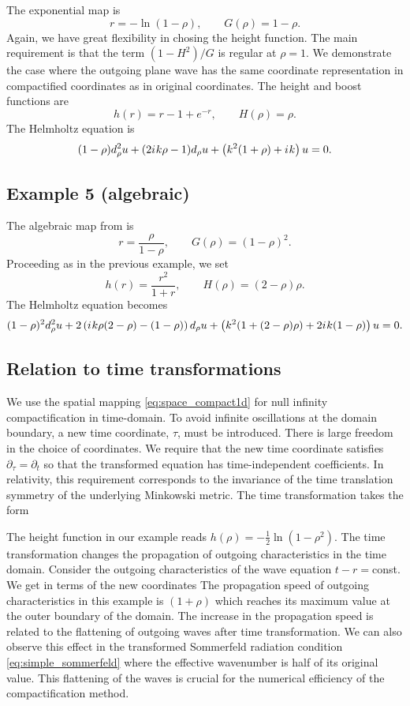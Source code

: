 \documentclass[draft,onefignum,onetabnum]{siamart190516}
\newcommand{\be}{\begin{equation}}
\newcommand{\ee}{\end{equation}}
\newcommand{\iu}{{i\mkern1mu}}
\begin{document}
The exponential map is
\be\label{eq:ex4_mapping} r = -\ln(1-\rho), \qquad G(\rho) = 1-\rho. \ee
Again, we have great flexibility in chosing the height function. The main requirement is that the term $(1-H^2)/G$ is regular at $\rho=1$. We demonstrate the case where the outgoing plane wave has the same coordinate representation in compactified coordinates as in original coordinates. The height and boost functions are
\[ h(r) = r - 1 + e^{-r}, \qquad H(\rho) = \rho. \]
The Helmholtz equation is
\[  (1-\rho) d_\rho^2 u + (2 \iu k \rho - 1) d_\rho u + \left(k^2(1+\rho) + \iu k \right) u = 0. \]

\subsection{Example 5 (algebraic)}
The algebraic map from \cite{GroschOrszag77} is
\be\label{eq:ext_mapping} r = \frac{\rho}{1-\rho}, \qquad G(\rho) = (1-\rho)^2. \ee
Proceeding as in the previous example, we set
\[ h(r) = \frac{r^2}{1+r},\qquad H(\rho) = (2-\rho)\rho.\]
The Helmholtz equation becomes
\[ (1-\rho)^2 d_\rho^2 u + 2 \left( \iu k \rho (2-\rho) - (1-\rho) \right)d_\rho u + \left( k^2 (1+(2-\rho)\rho) + 2 \iu k (1-\rho)  \right) u = 0. \]
\subsection{Relation to time transformations}\label{sec:time}

We use the spatial mapping \eqref{eq:space_compact1d} for null infinity compactification in time-domain. To avoid infinite oscillations at the domain boundary, a new time coordinate, $\tau$, must be introduced. There is large freedom in the choice of coordinates. We require that the new time coordinate satisfies $\partial_\tau=\partial_t$ so that the transformed equation has time-independent coefficients. In relativity, this requirement corresponds to the invariance of the time translation symmetry of the underlying Minkowski metric. The time transformation takes the form

The height function in our example reads $h(\rho)=-\tfrac{1}{2}\ln(1-\rho^2)$. The time transformation changes the propagation of outgoing characteristics in the time domain. Consider the outgoing characteristics of the wave equation $t-r=$const. We get in terms of the new coordinates
The propagation speed of outgoing characteristics in this example is $(1+\rho)$ which reaches its maximum value at the outer boundary of the domain. The increase in the propagation speed is related to the flattening of outgoing waves after time transformation. We can also observe this effect in the transformed Sommerfeld radiation condition \eqref{eq:simple_sommerfeld} where the effective wavenumber is half of its original value. This flattening of the waves is crucial for the numerical efficiency of the compactification method.
\end{document}
